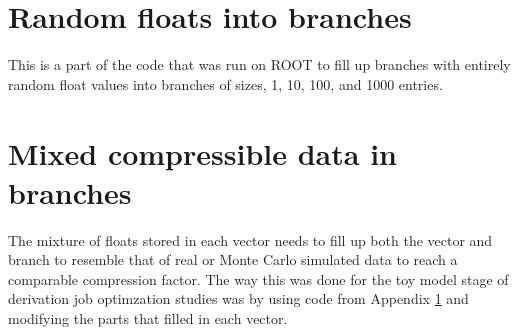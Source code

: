 \section{Random floats into branches}\label{appendix:toy_model_no_mix_code}

This is a part of the code that was run on ROOT to fill up branches with entirely random float values into branches of sizes, 1, 10, 100, and 1000 entries.


\section{Mixed compressible data in branches}\label{appendix:toy_model_WITH_mix_code}
The mixture of floats stored in each vector needs to fill up both the vector and branch to resemble that of real or Monte Carlo simulated data to reach a comparable compression factor.
The way this was done for the toy model stage of derivation job optimzation studies was by using code from Appendix \ref{appendix:toy_model_no_mix_code} and modifying the parts that filled in each vector.

 